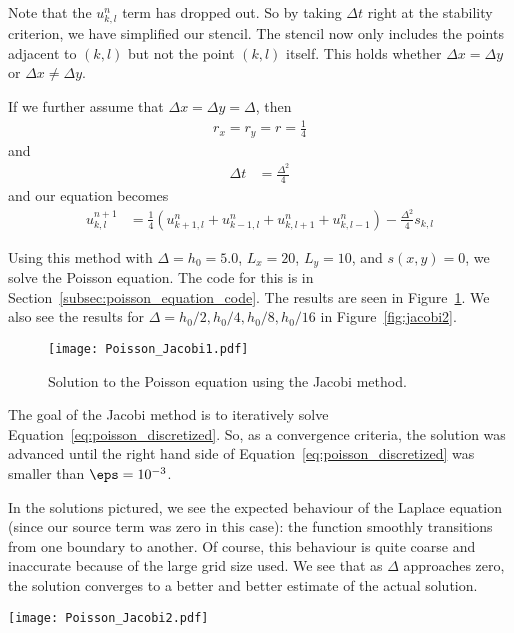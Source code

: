 \documentclass[twocolumn]{myarticle}
\numberwithin{equation}{section}
\begin{document}
Note that the $ u^n_{k,l} $ term has dropped out.
So by taking $ \Delta t $ right at the stability criterion, we have simplified our stencil.
The stencil now only includes the points adjacent to $ (k,l) $ but not the point $ (k,l) $ itself.
This holds whether $ \Delta x = \Delta y $ or $ \Delta x \neq \Delta y $.

If we further assume that $ \Delta x = \Delta y = \Delta $, then
\begin{align}
    r_x = r_y = r = \frac{1}{4}
\end{align}
and
\begin{align}
    \Delta t &= \frac{\Delta^2}{4}
\end{align}
and our equation becomes
\begin{align}
    u^{n+1}_{k,l} &= \frac{1}{4} \left( u^n_{k+1, l} + u^n_{k-1,l} + u^n_{k,l+1} + u^n_{k,l-1} \right) - \frac{\Delta^2}{4} s_{k,l}
\end{align}

Using this method with $ \Delta = h_0 = 5.0 $, $ L_x = 20 $, $ L_y = 10 $, and $ s(x,y) = 0 $, we solve the Poisson equation.
The code for this is in Section~\ref{subsec:poisson_equation_code}.
The results are seen in Figure~\ref{fig:jacobi1}.
We also see the results for $ \Delta = h_0/2, h_0/4, h_0/8, h_0/16 $ in Figure~\ref{fig:jacobi2}.

\begin{figure}[ht]
    \centering
    \texttt{[image: Poisson\_Jacobi1.pdf]}
    \caption{Solution to the Poisson equation using the Jacobi method.}
    \label{fig:jacobi1}
\end{figure}

The goal of the Jacobi method is to iteratively solve Equation~\ref{eq:poisson_discretized}.
So, as a convergence criteria, the solution was advanced until the right hand side of Equation~\ref{eq:poisson_discretized} was smaller than $ \eps = 10^{-3} $.

In the solutions pictured, we see the expected behaviour of the Laplace equation (since our source term was zero in this case): the function smoothly transitions from one boundary to another.
Of course, this behaviour is quite coarse and inaccurate because of the large grid size used.
We see that as $ \Delta $ approaches zero, the solution converges to a better and better estimate of the actual solution.

\begin{figure*}[ht]
    \centering
    \texttt{[image: Poisson\_Jacobi2.pdf]}
    \caption{More solutions to the Poisson equation using the Jacobi method.}
    \label{fig:jacobi2}
\end{figure*}
\end{document}
